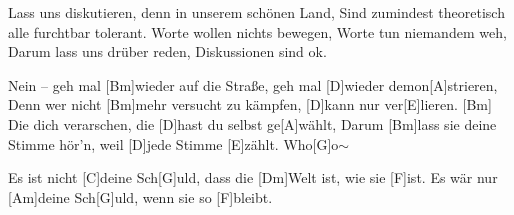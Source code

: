 \begin{guitar}
\begin{spacing}{0.98}
	Lass uns diskutieren, denn in unserem schönen Land,
	Sind zumindest theoretisch alle furchtbar tolerant.
	Worte wollen nichts bewegen, Worte tun niemandem weh,
	Darum lass uns drüber reden, Diskussionen sind ok.%
	\hfill\pagebreak\end{spacing}
	Nein – geh mal [Bm]wieder auf die Straße, geh mal [D]wieder demon[A]strieren,
	Denn wer nicht [Bm]mehr versucht zu kämpfen, [D]kann nur ver[E]lieren.
	[Bm] Die dich verarschen, die [D]hast du selbst ge[A]wählt,
	Darum [Bm]lass sie deine Stimme hör'n, weil [D]jede Stimme [E]zählt. Who[G]o$\sim$
	
	\begin{highlightbar}
		Es ist nicht [C]deine Sch[G]uld, dass die [Dm]Welt ist, wie sie [F]ist.
		Es wär nur [Am]deine Sch[G]uld, wenn sie so [F]bleibt.
	\end{highlightbar}
\end{guitar}